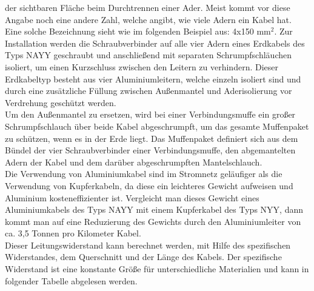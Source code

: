 der sichtbaren Fläche beim Durchtrennen einer Ader. Meist kommt vor diese Angabe noch eine andere Zahl, welche angibt, wie viele Adern ein Kabel hat. Eine 
solche Bezeichnung sieht wie im folgenden Beispiel aus: 4x150 $\text{mm}^2$. Zur Installation werden die Schraubverbinder auf alle vier Adern eines Erdkabels des 
Typs NAYY geschraubt und anschließend mit separaten Schrumpfschläuchen isoliert, um einen Kurzschluss zwischen den Leitern zu verhindern. Dieser Erdkabeltyp 
besteht aus vier Aluminiumleitern, welche einzeln isoliert sind und durch eine zusätzliche Füllung zwischen Außenmantel und Aderisolierung vor Verdrehung 
geschützt werden. \autocite{NKT_NAYY}
\\
Um den Außenmantel zu ersetzen, wird bei einer Verbindungsmuffe ein großer Schrumpfschlauch über beide Kabel abgeschrumpft, um das gesamte Muffenpaket zu 
schützen, wenn es in der Erde liegt. Das Muffenpaket definiert sich aus dem Bündel der vier Schraubverbinder einer Verbindungsmuffe, den abgemantelten Adern 
der Kabel und dem darüber abgeschrumpften Mantelschlauch. \autocite{Cellpack}
\\
Die Verwendung von Aluminiumkabel sind im Stromnetz geläufiger als die Verwendung von Kupferkabeln, da diese ein leichteres Gewicht aufweisen und Aluminium 
kosteneffizienter ist. Vergleicht man dieses Gewicht eines Aluminiumkabels des Typs NAYY mit einem Kupferkabel des Typs NYY, dann kommt man auf eine 
Reduzierung des Gewichts durch den Aluminiumleiter von ca. 3,5 Tonnen pro Kilometer Kabel. \autocite{NKT_NYY}
\\
Dieser Leitungswiderstand kann berechnet werden, mit Hilfe des spezifischen Widerstandes, dem Querschnitt und der Länge des Kabels. 
\clearpage
Der spezifische Widerstand ist eine konstante Größe für unterschiedliche Materialien und kann in folgender Tabelle abgelesen werden.
